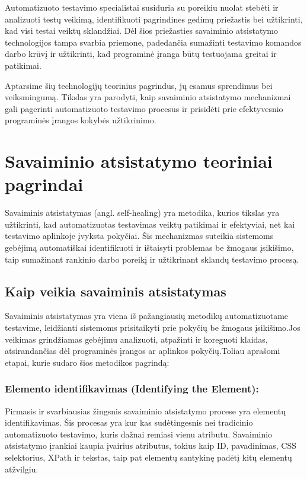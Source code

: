 \documentclass[
]{VUMIFPSkursinis}
\begin{document}
Automatizuoto testavimo specialistai susiduria su poreikiu nuolat stebėti ir analizuoti testų veikimą, identifikuoti pagrindines gedimų priežastis bei užtikrinti, kad visi testai veiktų sklandžiai. Dėl šios priežasties savaiminio atsistatymo technologijos tampa svarbia priemone, padedančia sumažinti testavimo komandos darbo krūvį ir užtikrinti, kad programinė įranga būtų testuojama greitai ir patikimai.

Aptarsime šių technologijų teorinius pagrindus, jų esamus sprendimus bei veiksmingumą. Tikslas yra parodyti, kaip savaiminio atsistatymo mechanizmai gali pagerinti automatizuoto testavimo procesus ir prisidėti prie efektyvesnio programinės įrangos kokybės užtikrinimo.

\section{Savaiminio atsistatymo teoriniai pagrindai}

Savaiminis atsistatymas (angl. self-healing) yra metodika, kurios tikslas yra užtikrinti, kad automatizuotas testavimas veiktų patikimai ir efektyviai, net kai testavimo aplinkoje įvyksta pokyčiai. Šis mechanizmas suteikia sistemoms gebėjimą automatiškai identifikuoti ir ištaisyti problemas be žmogaus įsikišimo, taip sumažinant rankinio darbo poreikį ir užtikrinant sklandų testavimo procesą.

\subsection{Kaip veikia savaiminis atsistatymas}

Savaiminis atsistatymas yra viena iš pažangiausių metodikų automatizuotame testavime, leidžianti sistemoms prisitaikyti prie pokyčių be žmogaus įsikišimo.Jos veikimas grindžiamas gebėjimu analizuoti, atpažinti ir koreguoti klaidas, atsirandančias dėl programinės įrangos ar aplinkos pokyčių.Toliau aprašomi etapai, kurie sudaro šios metodikos pagrindą:

\subsubsection{Elemento identifikavimas (Identifying the Element):} Pirmasis ir svarbiausias žingsnis savaiminio atsistatymo procese yra elementų identifikavimas. Šis procesas yra kur kas sudėtingesnis nei tradicinio automatizuoto testavimo, kuris dažnai remiasi vienu atributu. Savaiminio atsistatymo įrankiai kaupia įvairius atributus, tokius kaip ID, pavadinimas, CSS selektorius, XPath ir tekstas, taip pat elementų santykinę padėtį kitų elementų atžvilgiu.
\end{document}
